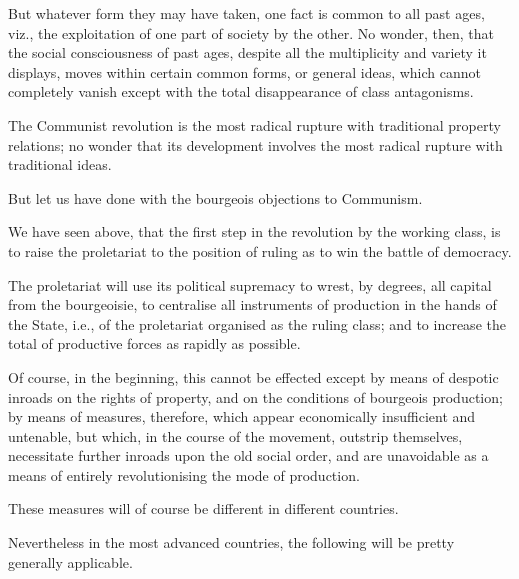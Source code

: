 \documentclass[, oneside]{article}   	%
\begin{document}
But whatever form they may have taken, one fact is common to all past ages, viz., the exploitation of one part of society by the other. No wonder, then, that the social consciousness of past ages, despite all the multiplicity and variety it displays, moves within certain common forms, or general ideas, which cannot completely vanish except with the total disappearance of class antagonisms.

The Communist revolution is the most radical rupture with traditional property relations; no wonder that its development involves the most radical rupture with traditional ideas.

But let us have done with the bourgeois objections to Communism.

We have seen above, that the first step in the revolution by the working class, is to raise the proletariat to the position of ruling as to win the battle of democracy.

The proletariat will use its political supremacy to wrest, by degrees, all capital from the bourgeoisie, to centralise all instruments of production in the hands of the State, i.e., of the proletariat organised as the ruling class; and to increase the total of productive forces as rapidly as possible.

Of course, in the beginning, this cannot be effected except by means of despotic inroads on the rights of property, and on the conditions of bourgeois production; by means of measures, therefore, which appear economically insufficient and untenable, but which, in the course of the movement, outstrip themselves, necessitate further inroads upon the old social order, and are unavoidable as a means of entirely revolutionising the mode of production.

These measures will of course be different in different countries.

Nevertheless in the most advanced countries, the following will be pretty generally applicable.
\end{document}

